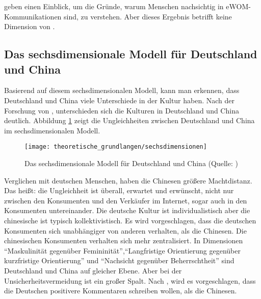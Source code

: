 \citet{Mangold1999wom} geben einen Einblick, um die Gründe, warum Menschen nachsichtig in \ac{eWOM}-Kommunikationen sind, zu verstehen. Aber dieses Ergebnis betrifft keine Dimension von \citeauthor{hofstede2013interkulturelle}.

\subsection{Das sechsdimensionale Modell für Deutschland und China} \label{6dimensionaleModell}
Basierend auf diesem sechsdimensionalen Modell, kann man erkennen, dass Deutschland und China viele Unterschiede in der Kultur haben. Nach der Forschung von \citet{hofstede2001culture, Singh2006, Cyr2014}, unterschieden sich die Kulturen in Deutschland und China deutlich. Abbildung \ref{fig:sechsdimensionen} zeigt die Ungleichheiten zwischen Deutschland und China im sechsdimensionalen Modell.

\begin{figure}[htb]
	\begin{center}
		\texttt{[image: theoretische\_grundlangen/sechsdimensionen]}
		\caption[Das sechsdimensionale Modell für Deutschland und China]{Das sechsdimensionale Modell für Deutschland und China (Quelle: \citealp{HofstedeWebseite})}
		\label{fig:sechsdimensionen}
	\end{center}
\end{figure}

Verglichen mit deutschen Menschen, haben die Chinesen größere Machtdistanz. Das heißt: die Ungleichheit ist überall, erwartet und erwünscht, nicht nur zwischen den Konsumenten und den Verkäufer im Internet, sogar auch in den Konsumenten untereinander. Die deutsche Kultur ist individualistisch aber die chinesische ist typisch kollektivistisch. Es wird vorgeschlagen, dass die deutschen Konsumenten sich unabhängiger von anderen verhalten, als die Chinesen. Die chinesischen Konsumenten verhalten sich mehr zentralisiert. In Dimensionen ``Maskulinität gegenüber Femininität'',``Langfristige Orientierung gegenüber kurzfristige Orientierung'' und ``Nachsicht gegenüber Beherrschtheit'' sind Deutschland und China auf gleicher Ebene. Aber bei der Unsicherheitsvermeidung ist ein großer Spalt. Nach \citet{donthu1998cultural}, wird es vorgeschlagen, dass die Deutschen positivere Kommentaren schreiben wollen, als die Chinesen. 

